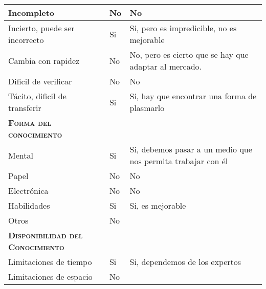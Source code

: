 \begin{table}[H]
{\begin{tabular}{|l|l|l|}
		Incompleto & \multicolumn{1}{p{1.0cm}|}{No} & \multicolumn{1}{p{13.0cm}|}{No}\\
		\hline

		Incierto, puede ser incorrecto & \multicolumn{1}{p{1.0cm}|}{Si} & \multicolumn{1}{p{13.0cm}|}{Si, pero es impredicible, no es mejorable}\\
		\hline

		Cambia con rapidez & \multicolumn{1}{p{1.0cm}|}{No} & \multicolumn{1}{p{13.0cm}|}{No, pero es cierto que se hay que adaptar al mercado.}\\
		\hline

		Dificil de verificar & \multicolumn{1}{p{1.0cm}|}{No} & \multicolumn{1}{p{13.0cm}|}{No}\\
		\hline

		Tácito, dificil de transferir& \multicolumn{1}{p{1.0cm}|}{Si} & \multicolumn{1}{p{13.0cm}|}{Si, hay que encontrar una forma de plasmarlo}\\
		\hline

		\textsc {\textbf{Forma del conocimiento}}& \multicolumn{1}{p{1.0cm}|}{} & \multicolumn{1}{p{13.0cm}|}{}\\
		\hline

		Mental & \multicolumn{1}{p{1.0cm}|}{Si} & \multicolumn{1}{p{13.0cm}|}{Si, debemos pasar a un medio que nos permita trabajar con él}\\
		\hline

		Papel & \multicolumn{1}{p{1.0cm}|}{No} & \multicolumn{1}{p{13.0cm}|}{No}\\
		\hline

		Electrónica & \multicolumn{1}{p{1.0cm}|}{No} & \multicolumn{1}{p{13.0cm}|}{No}\\
		\hline

		Habilidades & \multicolumn{1}{p{1.0cm}|}{Si} & \multicolumn{1}{p{13.0cm}|}{Si, es mejorable}\\
		\hline

		Otros & \multicolumn{1}{p{1.0cm}|}{No} & \multicolumn{1}{p{13.0cm}|}{}\\
		\hline

		\textsc {\textbf{Disponibilidad del Conocimiento}} & \multicolumn{1}{p{1.0cm}|}{} & \multicolumn{1}{p{13.0cm}|}{}\\
		\hline
		Limitaciones de tiempo& \multicolumn{1}{p{1.0cm}|}{Si} & \multicolumn{1}{p{13.0cm}|}{Si, dependemos de los expertos}\\
		\hline

		Limitaciones de espacio& \multicolumn{1}{p{1.0cm}|}{No} & \multicolumn{1}{p{13.0cm}|}{}\\
		\hline


\end{tabular}}
\end{table}
